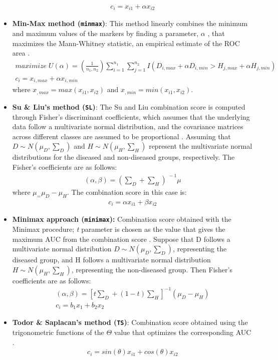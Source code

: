 \documentclass[10pt]{article}
\begin{document}
\begin{itemize}
\begin{gather*}
    c_i = x_{i1} + \alpha x_{i2}
    \end{gather*}
  \item \textbf{Min-Max method (\texttt{minmax})}: This method linearly combines the minimum and maximum values of the markers by finding a parameter, $\alpha$ , that maximizes the Mann-Whitney statistic, an empirical estimate of the ROC area \citep{liu2011min}.
    \begin{gather*}
    maximize\;U( \alpha ) = \left(\frac{1}{n_1,n_2}\right) {\sum_{i=1}^{n_1} {\sum_{j=1}^{n_2}}I(D_{i,max} + \alpha D_{i,min} > H_{j,max} + \alpha H_{j,min})} \\
    c_i = x_{i,max} + \alpha x_{i,min}
    \end{gather*}
where $x_{,max}=max(x_{i1}, x_{i2})$ and $x_{,min}=min(x_{i1}, x_{i2})$.
\item \textbf{Su \& Liu's method (\texttt{SL})}: The Su and Liu combination score is computed through Fisher's discriminant coefficients, which assumes that the underlying data follow a multivariate normal distribution, and the covariance matrices across different classes are assumed to be proportional \citep{su1993linear}. Assuming that $D\sim N(\mu_D,\textstyle \sum_D)$  and $H\sim N(\mu_H,\textstyle \sum_H)$ represent the multivariate normal distributions for the diseased and non-diseased groups, respectively. The Fisher’s coefficients are as follows:
    \begin{gather*} 
    (\alpha , \beta) = (\textstyle \sum_{D}+\sum_{H})^{\;-1}\mu
     \end{gather*} 
    where $\mu_=\mu_D - \mu_H$. The combination score in this case is:
    \begin{gather*}
    c_i = \alpha x_{i1} + \beta x_{i2}
    \end{gather*}
\item \textbf{Minimax approach (\texttt{minimax}):} Combination score obtained with the Minimax procedure; \emph{t} parameter is chosen as the value that gives the maximum AUC from the combination score \citep{sameera2016binary}. Suppose that D follows a multivariate normal distribution  $D\sim N(\mu_D,\textstyle \sum_D)$, representing the diseased group, and H follows a multivariate normal distribution $H\sim N(\mu_H,\textstyle \sum_H)$, representing the non-diseased group. Then Fisher’s coefficients are as follows:
  \begin{gather*} 
    (\alpha , \beta) = {[t { \textstyle \sum_{D}} + (1 - t)  \textstyle \sum_{H}] ^ {-1}}{(\mu_D - \mu_H)} \\
    c_i = b_1 x_1 + b_2 x_2
    \end{gather*}
    \item \textbf{Todor \& Saplacan’s method (\texttt{TS})}: Combination score obtained using the trigonometric functions of the $\Theta$ value that optimizes the corresponding AUC \citep{todor2014tools}.
    \begin{align*} 
    c_i = sin(\theta) x_{i1} + cos(\theta) x_{i2}
    \end{align*}
\end{itemize} 
\end{document}
